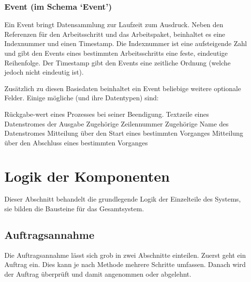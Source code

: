 

\subsubsection{Event (im Schema `Event')}

Ein Event bringt Datensammlung zur Laufzeit zum Ausdruck.
Neben den Referenzen für den Arbeitsschritt und das Arbeitspaket,
beinhaltet es eine Indexnummer und einen Timestamp.
Die Indexnummer ist eine aufsteigende Zahl
und gibt den Events eines bestimmten Arbeitsschritts eine feste, eindeutige Reihenfolge.
Der Timestamp gibt den Events eine zeitliche Ordnung (welche jedoch nicht eindeutig ist).


Zusätzlich zu diesen Basisdaten beinhaltet ein Event beliebige weitere optionale Felder.
Einige mögliche (und ihre Datentypen) sind:

\begin{itemize}
     Rückgabe-wert eines Prozesses bei seiner Beendigung.
     Textzeile eines Datenstromes der Ausgabe
     Zugehörige Zeilennummer
     Zugehörige Name des Datenstromes
     Mitteilung über den Start eines bestimmten Vorganges
     Mitteilung über den Abschluss eines bestimmten Vorganges
\end{itemize}




\section{Logik der Komponenten}
\label{sec:design:logik}

Dieser Abschnitt behandelt die grundlegende Logik  der Einzelteile des Systems,
sie bilden die Bausteine für das Gesamtsystem.


\subsection{Auftragsannahme}

Die Auftragsannahme lässt sich grob in zwei Abschnitte einteilen.
Zuerst geht ein Auftrag ein.
Dies kann je nach Methode mehrere Schritte umfassen.
Danach wird der Auftrag überprüft und damit angenommen oder abgelehnt.


